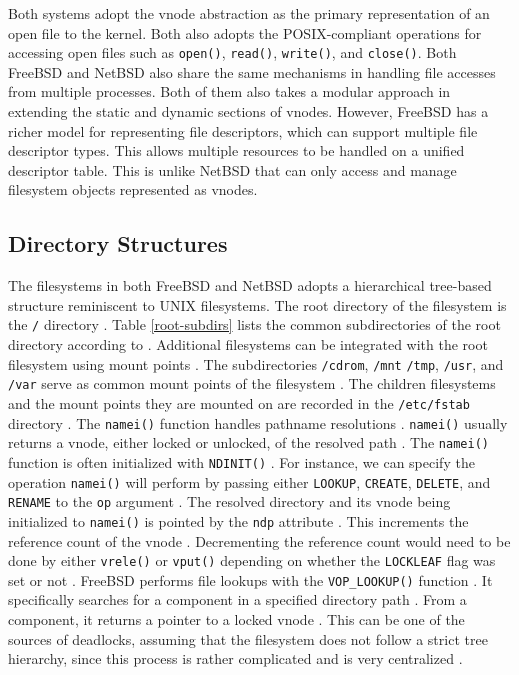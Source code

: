 Both systems adopt the vnode abstraction as the primary representation of an open file to the kernel. Both also adopts the
POSIX-compliant operations for accessing open files such as \texttt{open()}, \texttt{read()}, \texttt{write()}, and \texttt{close()}.
Both FreeBSD and NetBSD also share the same mechanisms in handling file accesses from multiple processes. Both of them also takes
a modular approach in extending the static and dynamic sections of vnodes. However, FreeBSD has a richer
model for representing file descriptors, which can support multiple file descriptor types. This allows multiple resources to be
handled on a unified descriptor table. This is unlike NetBSD that can only access and manage filesystem objects represented as
vnodes.

\subsection{Directory Structures} \label{dir-struct} %

The filesystems in both FreeBSD and NetBSD adopts a hierarchical tree-based structure reminiscent to UNIX filesystems. The root directory of the
filesystem is the \texttt{/} directory \parencite{freebsd_dir_struct}. Table \ref{root-subdirs} lists the common subdirectories of the
root directory according to \textcite{freebsd_dir_struct}. Additional filesystems can be integrated with the root filesystem using
mount points \parencite{freebsd_dir_struct}. The subdirectories \texttt{/cdrom}, \texttt{/mnt} \texttt{/tmp}, \texttt{/usr}, and \texttt{/var}
serve as common mount points of the filesystem \parencite{freebsd_dir_struct}. The children filesystems and the mount points they are
mounted on are recorded in the \texttt{/etc/fstab} directory \parencite{freebsd_dir_struct}. The \texttt{namei()} function handles
pathname resolutions \parencite{freebsd_namei}. \texttt{namei()} usually returns a vnode, either locked or unlocked, of the resolved
path \parencite{freebsd_namei}. The \texttt{namei()} function is often initialized with \texttt{NDINIT()} \parencite{freebsd_namei}.
For instance, we can specify the operation \texttt{namei()} will perform by passing either \texttt{LOOKUP},
\texttt{CREATE}, \texttt{DELETE}, and \texttt{RENAME} to the \texttt{op} argument \parencite{freebsd_namei}.
The resolved directory and its vnode being initialized to \texttt{namei()} is pointed by the \texttt{ndp} attribute \parencite{freebsd_namei}.
This increments the reference count of the vnode \parencite{freebsd_namei}. Decrementing the reference count would need to be done
by either \texttt{vrele()} or \texttt{vput()} depending on whether the \texttt{LOCKLEAF} flag was set or not \parencite{freebsd_namei}.
FreeBSD performs file lookups with the \texttt{VOP\_LOOKUP()} function \parencite{freebsd_voplookup}. It specifically searches for a
component in a specified directory path \parencite{freebsd_voplookup}. From a component, it returns a pointer to a locked vnode
\parencite{freebsd_voplookup}. This can be one of the sources of deadlocks, assuming that the filesystem does not follow a strict
tree hierarchy, since this process is rather complicated and is very centralized \parencite{freebsd_voplookup}.

